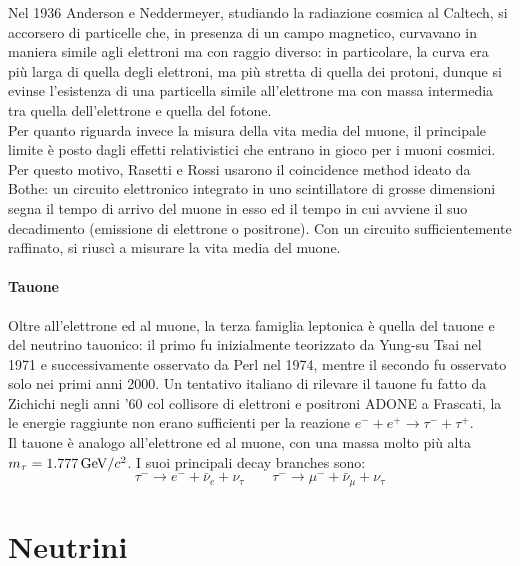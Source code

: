 Nel 1936 Anderson e Neddermeyer, studiando la radiazione cosmica al Caltech, si accorsero di particelle che, in presenza di un campo magnetico, curvavano in maniera simile agli elettroni ma con raggio diverso: in particolare, la curva era più larga di quella degli elettroni, ma più stretta di quella dei protoni, dunque si evinse l'esistenza di una particella simile all'elettrone ma con massa intermedia tra quella dell'elettrone e quella del fotone.\\
Per quanto riguarda invece la misura della vita media del muone, il principale limite è posto dagli effetti relativistici che entrano in gioco per i muoni cosmici. Per questo motivo, Rasetti e Rossi usarono il coincidence method ideato da Bothe: un circuito elettronico integrato in uno scintillatore di grosse dimensioni segna il tempo di arrivo del muone in esso ed il tempo in cui avviene il suo decadimento (emissione di elettrone o positrone). Con un circuito sufficientemente raffinato, si riuscì a misurare la vita media del muone.

\paragraph{Tauone}

Oltre all'elettrone ed al muone, la terza famiglia leptonica è quella del tauone e del neutrino tauonico: il primo fu inizialmente teorizzato da Yung-su Tsai nel 1971 e successivamente osservato da Perl nel 1974, mentre il secondo fu osservato solo nei primi anni 2000. Un tentativo italiano di rilevare il tauone fu fatto da Zichichi negli anni '60 col collisore di elettroni e positroni ADONE a Frascati, la le energie raggiunte non erano sufficienti per la reazione $ e^- + e^+ \rightarrow \tau^- + \tau^+ $.\\
Il tauone è analogo all'elettrone ed al muone, con una massa molto più alta $ m_{\tau} = 1.777\,\mathrm{GeV}/c^2 $. I suoi principali decay branches sono:
\begin{equation*}
	\tau^- \rightarrow e^- + \bar{\nu}_e + \nu_{\tau}
	\qquad
	\tau^- \rightarrow \mu^- + \bar{\nu}_{\mu} + \nu_{\tau}
\end{equation*}

\section{Neutrini}

